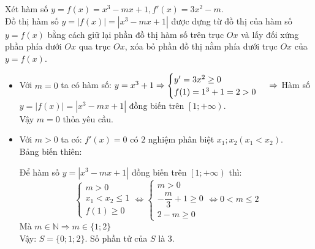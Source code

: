 \begin{Solbook}{22}
 \par \noindent  Xét hàm số $y=f(x)=x^3-mx+1, f'(x)=3x^2-m$. \\ Đồ thị hàm số $y=\left |f(x)\right |=\left |x^3-mx+1\right |$ được dựng từ đồ thị của hàm số $y=f(x)$ bằng cách giữ lại phần đồ thị hàm số trên trục $Ox$ và lấy đối xứng phần phía dưới $Ox$ qua trục $Ox$, xóa bỏ phần đồ thị nằm phía dưới trục $Ox$ của $y=f(x)$. \begin {itemize} \item Với $m=0$ ta có hàm số: $y=x^3+1 \Rightarrow \begin {cases} y'=3x^2 \geq 0\\ f(1)=1^3+1=2>0 \end {cases} \\ \Rightarrow $ Hàm số $y=\left |f(x)\right |=\left |x^3-mx+1\right |$ đồng biến trên $\left [1;+\infty \right )$. \\ Vậy $m=0$ thỏa yêu cầu. \item Với $m>0$ ta có: $f'(x)=0$ có $2$ nghiệm phân biệt $x_1;x_2 (x_1 < x_2)$. \\ Bảng biến thiên: \begin {center}  \end {center} Để hàm số $y=\left |x^3-mx+1\right |$ đồng biến trên $\left [1;+\infty \right )$ thì: $$\begin {cases} m>0 \\ x_1<x_2 \leq 1 \\ f(1) \geq 0 \end {cases} \Leftrightarrow \begin {cases} m>0 \\ -\dfrac {m}{3}+1 \geq 0 \\ 2-m \geq 0 \end {cases} \Leftrightarrow 0<m \leq 2$$ Mà $m \in \mathbb {N} \Rightarrow m \in \{1;2\}$\\ Vậy: $S=\{ 0;1;2\}$. Số phần tử của $S$ là $3$. \end {itemize}  \par \noindent \selectA \hfill \qedEX 
\end{Solbook}

